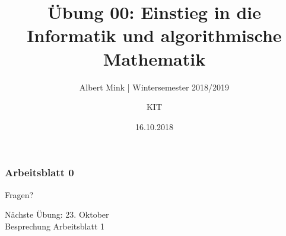 \documentclass[c,18pt]{beamer}
\date{16.10.2018}
\title[Übung 00: Einstieg in die Informatik und algorithmische Mathematik]
  {Übung 00: Einstieg in die Informatik und algorithmische Mathematik}
\subtitle{Albert Mink | Wintersemester 2018/2019}
\author[Albert Mink, ]{KIT}
\institute[Institut für Angewandte und Numerische Mathematik (IANM)]{Institut für Angewandte und Numerische Mathematik}
\begin{document}
\begin{frame}
  \maketitle
\end{frame}

\begin{frame}
  \frametitle{Arbeitsblatt 0}%
\tableofcontents[hideallsubsections]
\end{frame}

\def\kap{1}%

\def\kap{2}%

\def\kap{3}%

\def\kap{4}%


\def\kap{5}%

\def\kap{6}%




\begin{frame}
\centering
\Huge\textcolor{KITgreen}{Fragen?}
\vspace{2cm}

{\LARGE
N\"achste \"Ubung: 23. Oktober\\
Besprechung Arbeitsblatt 1
}
\end{frame}


\end{document}
